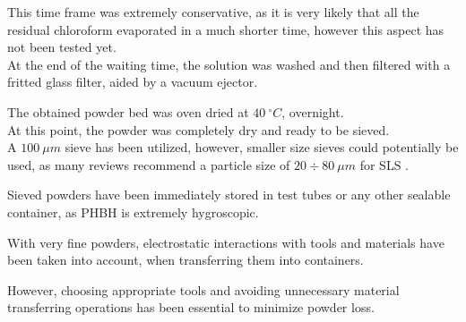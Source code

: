 \documentclass[a4paper]{article}
\begin{document}
        This time frame was extremely conservative, as it is very likely that all the residual chloroform 
        evaporated in a much shorter time, however this aspect has not been tested yet. \\

        At the end of the waiting time, the solution was washed and then filtered with a fritted glass filter, aided by a vacuum 
        ejector. 

%

        The obtained powder bed was oven dried at $40 \ ^{\circ}C$, overnight. \\ 

        At this point, the powder was completely dry and ready to be sieved. \\ 

        A $100 \ \mu m$ sieve has been utilized, however, smaller size sieves could potentially be used, as many reviews recommend a particle 
        size of $20 \div 80 \ \mu m$ for SLS \autocites{Padovano_SLS_Review}. 
        
%

        Sieved powders have been immediately stored in test tubes or any other sealable container, as PHBH is extremely hygroscopic. 

        With very fine powders, electrostatic interactions with tools and materials have been taken into account, when transferring 
        them into containers. 


        However, choosing appropriate tools and avoiding unnecessary material transferring operations has been essential to minimize powder loss. 

\end{document}
